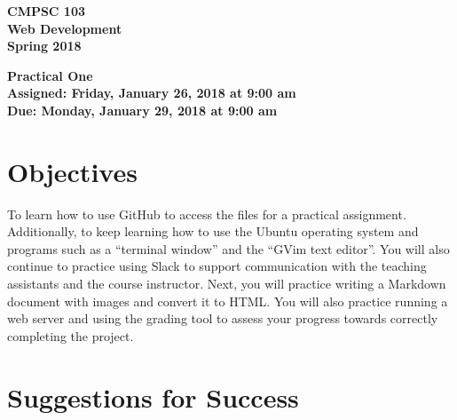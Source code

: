\documentclass[11pt]{article}
\newcommand{\assignmentduedate}{January 29}
\newcommand{\assignmentassignedate}{January 26}
\newcommand{\assignmentnumber}{One}
\newcommand{\labyear}{2018}
\newcommand{\labdueday}{Monday}
\newcommand{\labassignday}{Friday}
\newcommand{\labtime}{9:00 am}
\newcommand{\assigneddate}{Assigned: \labassignday, \assignmentassignedate, \labyear{} at \labtime{}}
\newcommand{\duedate}{Due: \labdueday, \assignmentduedate, \labyear{} at \labtime{}}
\newcommand{\labtitle}[1]
{
  \begin{center}
    \begin{center}
      \bf
      CMPSC 103\\Web Development\\
      Spring 2018\\
      \medskip
    \end{center}
    \bf
    #1
  \end{center}
}
\begin{document}
\thispagestyle{empty}

\labtitle{Practical \assignmentnumber{} \\ \assigneddate{} \\ \duedate{}}

\section*{Objectives}

To learn how to use GitHub to access the files for a practical assignment. Additionally, to keep learning how to use the
Ubuntu operating system and programs such as a ``terminal window'' and the ``GVim text editor''. You will also continue
to practice using Slack to support communication with the teaching assistants and the course instructor. Next, you will
practice writing a Markdown document with images and convert it to HTML. You will also practice running a web server and
using the grading tool to assess your progress towards correctly completing the project.

\section*{Suggestions for Success}
\end{document}
